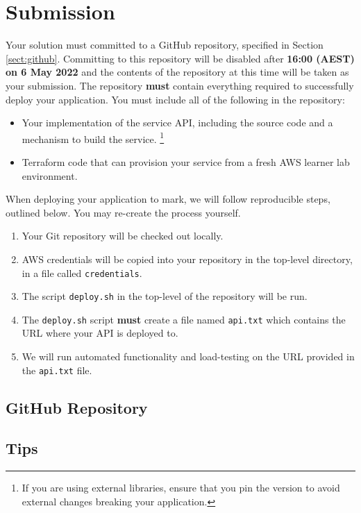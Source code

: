 \documentclass{csse4400}
\begin{document}
\section{Submission}
Your solution must committed to a GitHub repository, specified in Section \ref{sect:github}.
Committing to this repository will be disabled after \textbf{16:00 (AEST) on 6 May 2022} and the contents of the repository at this time will be taken as your submission.
The repository \textbf{must} contain everything required to successfully deploy your application.
You must include all of the following in the repository:
\begin{itemize}
  \item Your implementation of the service API, including the source code and a mechanism to build the service.%
  \footnote{If you are using external libraries, ensure that you pin the version to avoid external changes breaking your application.}
  \item Terraform code that can provision your service from a fresh AWS learner lab environment.
\end{itemize}

When deploying your application to mark,
we will follow reproducible steps, outlined below.
You may re-create the process yourself.

\begin{enumerate}
  \item Your Git repository will be checked out locally.
  \item AWS credentials will be copied into your repository in the top-level directory,
  in a file called \texttt{credentials}.
  \item The script \texttt{deploy.sh} in the top-level of the repository will be run.
  \item The \texttt{deploy.sh} script \textbf{must} create a file named \texttt{api.txt} which contains the URL where your API is deployed to.
  \item We will run automated functionality and load-testing on the URL provided in the \texttt{api.txt} file.
\end{enumerate}

\subsection{GitHub Repository}\label{sec:github}

\subsection{Tips}
\end{document}
